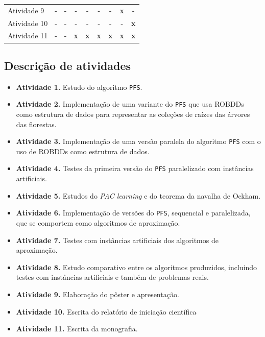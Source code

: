 \documentclass[12pt]{article}
\begin{document}
\begin{table}[!ht]
\begin{center}
\begin{tabular}{l cccccccc}
    \small Atividade 9
    & \small - & \small - & \small - & \small - & \small -  
    & \small - & \small {\bf x} & \small - \\

    \small Atividade 10
    & \small - & \small - & \small - & \small - & \small -  
    & \small - & \small - & \small {\bf x} \\

    \small Atividade 11
    & \small - & \small - & \small {\bf x} & \small {\bf x} 
    & \small {\bf x}  & \small {\bf x} & \small {\bf x}
    & \small {\bf x} \\



    \bottomrule
\end{tabular}
\end{center}
\end{table}

\subsection{Descrição de atividades} \label{sec:atividades}
\begin{itemize}
    \item{\bf Atividade 1.}
        Estudo do algoritmo {\tt PFS}.
    \item{\bf Atividade 2.}
        Implementação de uma variante do {\tt PFS} que usa ROBDDs como 
        estrutura de dados para representar as coleções de raízes das 
        árvores das florestas.
    \item{\bf Atividade 3.}
        Implementação de uma versão paralela do algoritmo {\tt PFS} com
        o uso de ROBDDs como estrutura de dados.
    \item{\bf Atividade 4.}
        Testes da primeira versão do {\tt PFS} paralelizado com 
        instâncias artificiais.
    \item{\bf Atividade 5.}
        Estudos do {\em PAC learning} e do teorema da navalha de Ockham.
    \item{\bf Atividade 6.}
        Implementação de versões do {\tt PFS}, sequencial e 
        paralelizada, que se comportem como algoritmos de aproximação.
    \item{\bf Atividade 7.} 
        Testes com instâncias artificiais dos algoritmos de aproximação.
    \item{\bf Atividade 8.}
        Estudo comparativo entre os algoritmos produzidos, incluindo 
        testes com instâncias artificiais e também de problemas reais.
    \item{\bf Atividade 9.}
        Elaboração do pôster e apresentação.
    \item{\bf Atividade 10.}
        Escrita do relatório de iniciação científica
    \item{\bf Atividade 11.}
        Escrita da monografia.
    \end{itemize}
\end{document}
